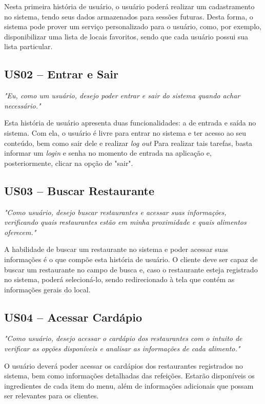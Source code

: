 Nesta primeira história de usuário, o usuário poderá realizar um cadastramento no sistema, tendo seus dados armazenados para sessões futuras. Desta forma, o sistema pode prover um serviço personalizado para o usuário, como, por exemplo, disponibilizar uma lista de locais favoritos, sendo que cada usuário possui sua lista particular.

\subsection{US02 -- Entrar e Sair}

\textit{"Eu, como um usuário, desejo poder entrar e sair do sistema quando achar necessário."}

Esta história de usuário apresenta duas funcionalidades: a de entrada e saída no sistema. Com ela, o usuário é livre para entrar no sistema e ter acesso ao seu conteúdo, bem como sair dele e realizar \textit{log out} Para realizar tais tarefas, basta informar um \textit{login} e senha no momento de entrada na aplicação e, posteriormente, clicar na opção de "sair".

\subsection{US03 -- Buscar Restaurante}

\textit{"Como usuário, desejo buscar restaurantes e acessar suas informações,  verificando quais restaurantes estão em minha proximidade e quais alimentos oferecem."}

A habilidade de buscar um restaurante no sistema e poder acessar suas informações é o que compõe esta história de usuário. O cliente deve ser capaz de buscar um restaurante no campo de busca e, caso o restaurante esteja registrado no sistema, poderá selecioná-lo, sendo redirecionado à tela que contém as informações gerais do local. 

\subsection{US04 -- Acessar Cardápio}

\textit{"Como usuário, desejo acessar o cardápio dos restaurantes com o intuito de verificar as opções disponíveis e analisar as informações de cada alimento."}

O usuário deverá poder acessar os cardápios dos restaurantes registrados no sistema, bem como informações detalhadas das refeições. Estarão disponíveis os ingredientes de cada item do menu, além de informações adicionais que possam ser relevantes para os clientes.


